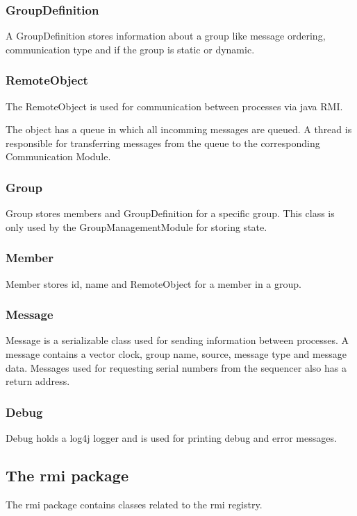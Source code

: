 \documentclass[english]{article}
\begin{document}
\subsubsection{GroupDefinition}
A GroupDefinition stores information about a group like message ordering, communication type and if the group is static or dynamic. 

\subsubsection{RemoteObject}
The RemoteObject is used for communication between processes via java RMI. 

The object has a queue in which all incomming messages are queued. A thread is responsible for transferring messages from the queue to the corresponding Communication Module.

\subsubsection{Group}
Group stores members and GroupDefinition for a specific group. This class is only used by the GroupManagementModule for storing state.

\subsubsection{Member}
Member stores id, name and RemoteObject for a member in a group.

\subsubsection{Message}
Message is a serializable class used for sending information between processes. A message contains a vector clock, group name, source, message type and message data. Messages used for requesting serial numbers from the sequencer also has a return address.

\subsubsection{Debug}
Debug holds a log4j logger and is used for printing debug and error messages.

\subsection{The rmi package}
The rmi package contains classes related to the rmi registry. 
\end{document}

